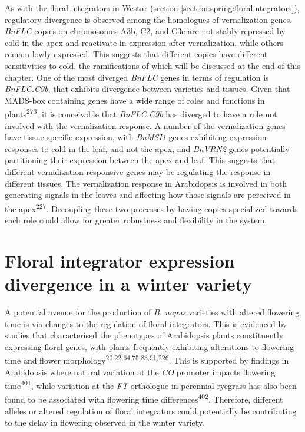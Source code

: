 \documentclass[12pt,]{book}
\begin{document}
As with the floral integrators in Westar (section
\ref{section:spring:floralintegrators}), regulatory divergence is
observed among the homologues of vernalization genes. \emph{BnFLC}
copies on chromosomes A3b, C2, and C3c are not stably repressed by cold
in the apex and reactivate in expression after vernalization, while
others remain lowly expressed. This suggests that different copies have
different sensitivities to cold, the ramifications of which will be
discussed at the end of this chapter. One of the most diverged
\emph{BnFLC} genes in terms of regulation is \emph{BnFLC.C9b}, that
exhibits divergence between varieties and tissues. Given that MADS-box
containing genes have a wide range of roles and functions in
plants\textsuperscript{273}, it is conceivable that \emph{BnFLC.C9b} has
diverged to have a role not involved with the vernalization response. A
number of the vernalization genes have tissue specific expression, with
\emph{BnMSI1} genes exhibiting expression responses to cold in the leaf,
and not the apex, and \emph{BnVRN2} genes potentially partitioning their
expression between the apex and leaf. This suggests that different
vernalization responsive genes may be regulating the response in
different tissues. The vernalization response in Arabidopsis is involved
in both generating signals in the leaves and affecting how those signals
are perceived in the apex\textsuperscript{227}. Decoupling these two
processes by having copies specialized towards each role could allow for
greater robustness and flexibility in the system.

\section{Floral integrator expression divergence in a winter
variety}\label{section:winter:floralintegrators}

A potential avenue for the production of \emph{B. napus} varieties with
altered flowering time is via changes to the regulation of floral
integrators. This is evidenced by studies that characterised the
phenotypes of Arabidopsis plants constituently expressing floral genes,
with plants frequently exhibiting alterations to flowering time and
flower morphology\textsuperscript{20,22,64,75,83,91,226}. This is
supported by findings in Arabidopsis where natural variation at the
\emph{CO} promoter impacts flowering time\textsuperscript{401}, while
variation at the \emph{FT} orthologue in perennial ryegrass has also
been found to be associated with flowering time
differences\textsuperscript{402}. Therefore, different alleles or
altered regulation of floral integrators could potentially be
contributing to the delay in flowering observed in the winter variety.
\end{document}
